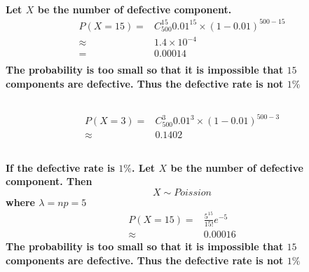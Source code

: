 \documentclass{article}
\begin{document}
            \paragraph{
                Let $X$ be the number of defective component.
                \begin{equation*}
                    \begin{split}
                        P(X=15)=&C_{500}^{15}0.01^{15}\times(1-0.01)^{500-15}\\
                            \approx&1.4\times 10^{-4}\\
                            =&0.00014\\
                    \end{split}
                \end{equation*}
                The probability is too small so that it is impossible that $15$ components are defective. Thus the defective rate is not $1\%$
            }
        \subsection{}
            \paragraph{
                \begin{equation*}
                    \begin{split}
                        P(X=3)=&C_{500}^3 0.01^3\times(1-0.01)^{500-3}\\
                            \approx&0.1402
                    \end{split}
                \end{equation*}
            }
        \subsection{}
            \paragraph{
                If the defective rate is $1\%$. Let $X$ be the number of defective component. Then $$X\sim Poission$$ where $\lambda=np=5$
                \begin{equation*}
                    \begin{split}
                        P(X=15)=&\frac{5^{15}}{15!}e^{-5}\\
                            \approx&0.00016
                    \end{split}
                \end{equation*}
                The probability is too small so that it is impossible that $15$ components are defective. Thus the defective rate is not $1\%$
            }
\end{document}
